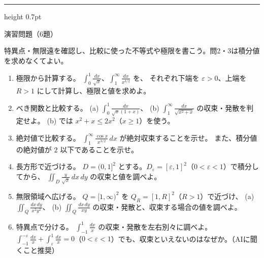 \documentclass[a4paper,10pt,pdflatex,ja=standard,jafont=ipaex-type1,
  magstyle=real,scale=1]{bxjsarticle}
\newcommand{\topic}[1]{\par\vspace{5pt}%
  {\large\sffamily\mdseries\color{accent}#1}\par\vspace{2pt}}
\newenvironment{problems}
  {\begin{enumerate}[leftmargin=2em,itemsep=3pt,topsep=3pt,parsep=0pt,
    font=\color{accent}]}
  {\end{enumerate}}
\newcommand{\examplelabel}[1]{{\sffamily\mdseries\color{ink}#1}}
\newcommand{\problemspace}{\par\vspace{5mm}}
\newcommand{\exercises}{%
  {\color{accent}\hrule height 0.7pt}\vspace{3pt}%
  \topic{演習問題（6題）}%
  {\small 特異点・無限遠を確認し、比較に使った不等式や極限を書こう。問2・3は積分値を求めなくてよい。}\par}
\begin{document}
\begin{minipage}[b][\dimexpr0.5\textheight-\parskip\relax][t]{\linewidth}
\end{minipage}\par\nointerlineskip
\noindent\begin{minipage}[b][0.5\textheight][t]{\linewidth}
\exercises
\begin{problems}
\item \examplelabel{極限から計算する。}
$\displaystyle\int_0^1\frac{dx}{\sqrt{x}}$、$\displaystyle\int_1^\infty\frac{dx}{x^{3/2}}$ を、
それぞれ下端を $\varepsilon>0$、上端を $R>1$ にして計算し、極限と値を求めよ。
\problemspace

\item \examplelabel{べき関数と比較する。}
(a) $\displaystyle\int_0^1\frac{dx}{\sqrt{x}(1+x)}$、
(b) $\displaystyle\int_1^\infty\frac{dx}{\sqrt{x^2+x}}$ の収束・発散を判定せよ。
(b) では $x^2+x\le2x^2$（$x\ge1$）を使う。
\problemspace

\item \examplelabel{絶対値で比較する。}
$\displaystyle\int_1^\infty\frac{\cos x}{x^{3/2}}\,dx$ が絶対収束することを示せ。
また、積分値の絶対値が $2$ 以下であることを示せ。
\problemspace


\item \examplelabel{長方形で近づける。}
$D=(0,1]^2$ とする。$D_\varepsilon=[\varepsilon,1]^2$（$0<\varepsilon<1$）で積分してから、
$\displaystyle\iint_D\frac{y}{\sqrt{x}}\,dx\,dy$ の収束と値を調べよ。
\problemspace

\item \examplelabel{無限領域へ広げる。}
$Q=[1,\infty)^2$ を $Q_R=[1,R]^2$（$R>1$）で近づけ、
(a) $\displaystyle\iint_Q\frac{dx\,dy}{x^2y^2}$、
(b) $\displaystyle\iint_Q\frac{dx\,dy}{xy}$ の収束・発散と、収束する場合の値を調べよ。
\problemspace
\item \examplelabel{特異点で分ける。}
$\displaystyle\int_{-1}^1\frac{dx}{x}$ の収束・発散を左右別々に調べよ。
$\displaystyle\int_{-1}^{-\varepsilon}\frac{dx}{x}+\int_\varepsilon^1\frac{dx}{x}=0$（$0<\varepsilon<1$）でも、収束といえないのはなぜか。（AIに聞くこと推奨）
\problemspace

\end{problems}
\end{minipage}
\end{document}
